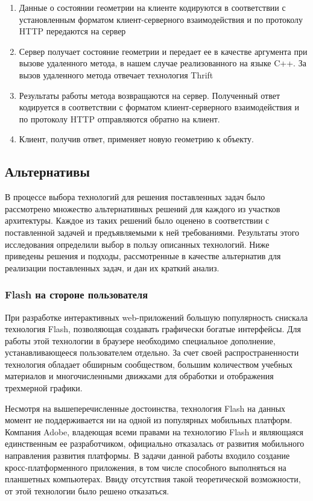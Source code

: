 \documentclass[14pt, a4paper]{extarticle}
\begin{document}
\begin{enumerate}
    \item Данные о состоянии геометрии на клиенте кодируются в соответствии с
    установленным форматом клиент-серверного взаимодействия и по протоколу HTTP
    передаются на сервер
    \item Сервер получает состояние геометрии и передает ее в качестве аргумента
    при вызове удаленного метода, в нашем случае реализованного на языке C++.
    За вызов удаленного метода отвечает технология Thrift
    \item Результаты работы метода возвращаются на сервер. Полученный ответ
    кодируется в соответствии с форматом клиент-серверного взаимодействия и по
    протоколу HTTP отправляются обратно на клиент.
    \item Клиент, получив ответ, применяет новую геометрию к объекту.
\end{enumerate}


\subsection{Альтернативы}

В процессе выбора технологий для решения поставленных задач было
рассмотрено множество альтернативных решений для каждого из участков
архитектуры. Каждое из таких решений было оценено в соответствии с
поставленной задачей и предъявляемыми к ней требованиями. Результаты
этого исследования определили выбор в пользу описанных технологий. Ниже
приведены решения и подходы, рассмотренные в качестве альтернатив для
реализации поставленных задач, и дан их краткий анализ.

\subsubsection{Flash на стороне пользователя}

При разработке интерактивных web-приложений большую популярность снискала
технология Flash, позволяющая создавать графически богатые интерфейсы. Для
работы этой технологии в браузере необходимо специальное дополнение,
устанавливающееся пользователем отдельно. За счет
своей распространенности технология обладает обширным сообществом, большим
количеством учебных материалов и многочисленными движками для обработки и
отображения трехмерной графики.

Несмотря на вышеперечисленные достоинства, технология Flash на данных момент не
поддерживается ни на одной из популярных мобильных платформ. Компания Adobe,
владеющая всеми правами на технологию Flash и являющаяся единственным ее
разработчиком, официально отказалась от развития мобильного направления развития
платформы. В задачи данной работы входило создание кросс-платформенного
приложения, в том числе способного выполняться на планшетных компьютерах. Ввиду
отсутствия такой теоретической возможности, от этой технологии было решено
отказаться.
\end{document}
